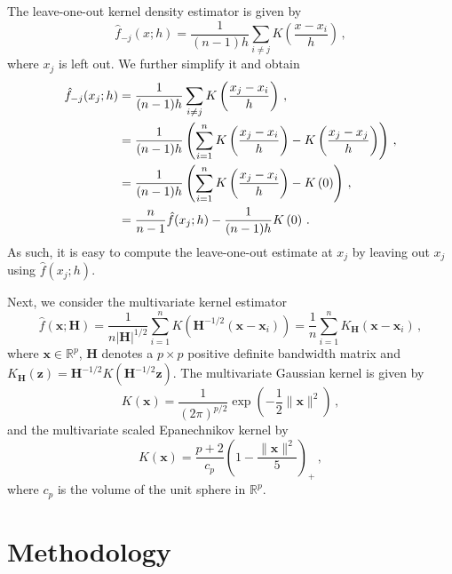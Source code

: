 \documentclass[letter,12pt]{article}
\begin{document}
The leave-one-out kernel density estimator is given by
\begin{equation}\label{eq:kde9}
    \hat{f}_{-j}(x;h) = \frac{1}{(n-1)h}\sum_{i \neq j} K\left(\frac{x-x_i}{h}\right)\, ,  
\end{equation}
where $x_j$ is left out. We further simplify it and obtain %
\begin{align}\label{eq:kde10}
    \hat{f}_{-j}(x_j;h) & = \frac{1}{(n-1)h}\sum_{i \neq j} K\left(\frac{x_j-x_i}{h}\right)\, , \notag \\
    & = \frac{1}{(n-1)h} \left(\sum_{i = 1}^n K\left(\frac{x_j-x_i}{h}\right) - K\left(\frac{x_j-x_j}{h}\right)  \right) \, , \notag  \\
    & = \frac{1}{(n-1)h} \left(\sum_{i = 1}^n K\left(\frac{x_j-x_i}{h}\right) - K\left(0\right)  \right) \, , \notag  \\
    & = \frac{n}{n-1} \hat{f}(x_j;h) - \frac{1}{(n-1)h} K\left(0\right) \, .
\end{align}
As such, it is easy to compute the leave-one-out estimate at $x_j$ by leaving out $x_j$ using $\hat{f}(x_j;h)$. 

Next, we consider the multivariate kernel estimator
\begin{equation}\label{eq:kde6}
    \hat{f}\left(\bm{x}; \bm{H}\right) = \frac{1}{n|\bm{H}|^{1/2}} \sum_{i=1}^n K\left(\bm{H}^{-1/2}(\bm{x} -\bm{x}_i) \right) = \frac{1}{n} \sum_{i=1}^n K_{\bm{H}}\left(\bm{x} -\bm{x}_i \right)\, ,
\end{equation}
where $\mathbf{x} \in \mathbb{R}^p$, $\bm{H}$ denotes a $ p \times p$ positive definite bandwidth matrix and $K_{\bm{H}}(\bm{z}) = \bm{H}^{-1/2} K(\bm{H}^{-1/2} \bm{z})$. The multivariate Gaussian kernel is given by
\begin{equation}\label{eq:kde7}
    K(\bm{x}) = \frac{1}{(2\pi)^{p/2}} \exp\left( -\frac{1}{2} \| \bm{x} \| ^2\right)\, , 
\end{equation}
and the multivariate scaled Epanechnikov kernel by
\begin{equation}\label{eq:kde8}
    K(\bm{x}) = \frac{p+2}{c_p}\left(1 - \frac{\| \bm{x} \| ^2}{5} \right)_+ \, , 
\end{equation}
where $c_p$ is the volume of the unit sphere in $\mathbb{R}^p$.


\section{Methodology}\label{sec:lookout}
\end{document}
